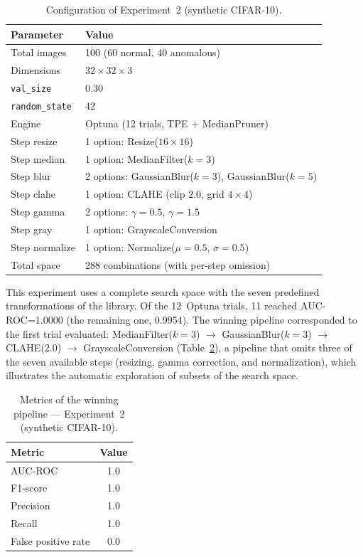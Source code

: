 \documentclass[conference]{IEEEtran}
\begin{document}
\begin{table}[t]
\centering
\renewcommand{\arraystretch}{1.2}
\caption{Configuration of Experiment~2 (synthetic CIFAR-10).}
\label{tab:espacio_exp2}
\begin{tabular}{@{}ll@{}}
\toprule
\textbf{Parameter} & \textbf{Value} \\
\midrule
Total images        & 100 (60 normal, 40 anomalous) \\
Dimensions          & $32\times32\times3$ \\
\texttt{val\_size}  & 0.30 \\
\texttt{random\_state} & 42 \\
Engine              & Optuna (12 trials, TPE + MedianPruner) \\
Step resize         & 1 option: Resize($16\times16$) \\
Step median         & 1 option: MedianFilter($k=3$) \\
Step blur           & 2 options: GaussianBlur($k=3$), GaussianBlur($k=5$) \\
Step clahe          & 1 option: CLAHE (clip $2.0$, grid $4\times4$) \\
Step gamma          & 2 options: $\gamma=0.5$, $\gamma=1.5$ \\
Step gray           & 1 option: GrayscaleConversion \\
Step normalize      & 1 option: Normalize($\mu=0.5$, $\sigma=0.5$) \\
Total space         & 288 combinations (with per-step omission) \\
\bottomrule
\end{tabular}
\end{table}

This experiment uses a complete search space with the seven predefined
transformations of the library. Of the 12~Optuna trials, 11 reached
AUC-ROC=1.0000 (the remaining one, 0.9954). The winning pipeline corresponded
to the first trial evaluated: MedianFilter($k=3$) $\to$ GaussianBlur($k=3$)
$\to$ CLAHE($2.0$) $\to$ GrayscaleConversion (Table~\ref{tab:metricas_exp2}), a
pipeline that omits three of the seven available steps (resizing, gamma
correction, and normalization), which illustrates the automatic exploration of
subsets of the search space.

\begin{table}[t]
\centering
\renewcommand{\arraystretch}{1.2}
\caption{Metrics of the winning pipeline — Experiment~2 (synthetic CIFAR-10).}
\label{tab:metricas_exp2}
\begin{tabular}{@{}lc@{}}
\toprule
\textbf{Metric} & \textbf{Value} \\
\midrule
AUC-ROC              & 1.0 \\
F1-score             & 1.0 \\
Precision            & 1.0 \\
Recall               & 1.0 \\
False positive rate  & 0.0 \\
\bottomrule
\end{tabular}
\end{table}
\end{document}
